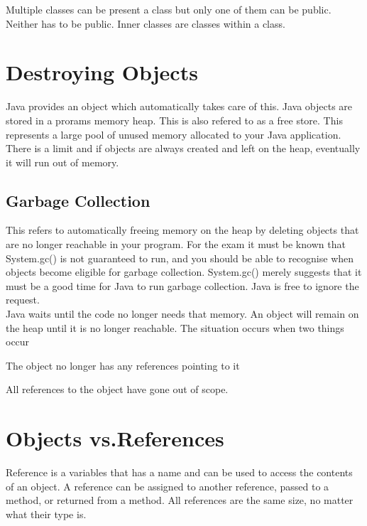 \documentclass[a4paper]{report}   %
\begin{document}
Multiple classes can be present a class but only one of them can be public. Neither has to be public. Inner classes are classes within a class.

\section{Destroying Objects}

Java provides an object which automatically takes care of this. Java objects are stored in a prorams memory heap. This is also refered to as a free store. This represents a large pool of unused memory allocated to your Java application. There is a limit and if objects are always created and left on the heap, eventually it will run out of memory.

\subsection{Garbage Collection}

This refers to automatically freeing memory on the heap by deleting objects that are no longer reachable in your program. For the exam it must be known that System.gc() is not guaranteed to run, and you should be able to recognise when objects become eligible for garbage collection. System.gc() merely suggests that it must be a good time for Java to run garbage collection. Java is free to ignore the request.\\

Java waits until the code no longer needs that memory. An object will remain on the heap until it is no longer reachable. The situation occurs when two things occur
\begin{list}{•}{•}
\item The object no longer has any references pointing to it
\item All references to the object have gone out of scope.
\end{list}

\section{Objects vs.References}

Reference is a variables that has a name and can be used to access the contents of an object. A reference can be assigned to another reference, passed to a method, or returned from a method. All references are the same size, no matter what their type is.\\
\end{document}
